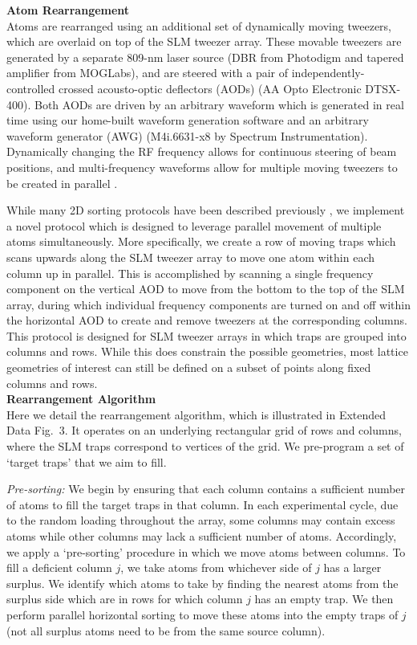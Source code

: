 \documentclass[reprint,twocolumn,secnumarabic,amssymb, aps, prl]{revtex4-1}
\begin{document}
\noindent\textbf{Atom Rearrangement}\\
Atoms are rearranged using an additional set of dynamically moving tweezers, which are overlaid on top of the SLM tweezer array. These movable tweezers are generated by a separate 809-nm laser source (DBR from Photodigm and tapered amplifier from MOGLabs), and are steered with a pair of independently-controlled crossed acousto-optic deflectors (AODs) (AA Opto Electronic DTSX-400). Both AODs are driven by an arbitrary waveform which is generated in real time using our home-built waveform generation software and an arbitrary waveform generator (AWG)  (M4i.6631-x8 by Spectrum Instrumentation). Dynamically changing the RF frequency allows for continuous steering of beam positions, and  multi-frequency waveforms allow for multiple moving tweezers to be created in parallel \cite{Endres2016}.

While many 2D sorting protocols have been described previously \cite{AntoineAssembly2016, AhnSorting2017, MingshengZhan2DSorting, Birkl2019, Antoine2DSorting}, we implement a novel protocol which is designed to leverage parallel movement of multiple atoms simultaneously. More specifically, we create a row of moving traps which scans upwards along the SLM tweezer array to move one atom within each column up in parallel. This is accomplished by scanning a single frequency component on the vertical AOD to move from the bottom to the top of the SLM array, during which individual frequency components are turned on and off within the horizontal AOD to create and remove tweezers at the corresponding columns. This protocol is designed for SLM tweezer arrays in which traps are grouped into columns and rows. While this does constrain the possible geometries, most lattice geometries of interest can still be defined on a subset of points along fixed columns and rows. \\

\noindent\textbf{Rearrangement Algorithm}\\
Here we detail the rearrangement algorithm, which is illustrated in Extended Data Fig.~3. It operates on an underlying rectangular grid of rows and columns, where the SLM traps correspond to vertices of the grid. We pre-program a set of `target traps' that we aim to fill.


\emph{Pre-sorting:} We begin by ensuring that each column contains a sufficient number of atoms to fill the target traps in that column. In each experimental cycle, due to the random loading throughout the array, some columns may contain excess atoms while other columns may lack a sufficient number of atoms. Accordingly, we apply a `pre-sorting' procedure in which we move atoms between columns. To fill a deficient column $j$, we take atoms from whichever side of $j$ has a larger surplus.
We identify which atoms to take by finding the nearest atoms from the surplus side which are in rows for which column $j$ has an empty trap.
We then perform parallel horizontal sorting to move these atoms into the empty traps of $j$ (not all surplus atoms need to be from the same source column). 
\end{document}
